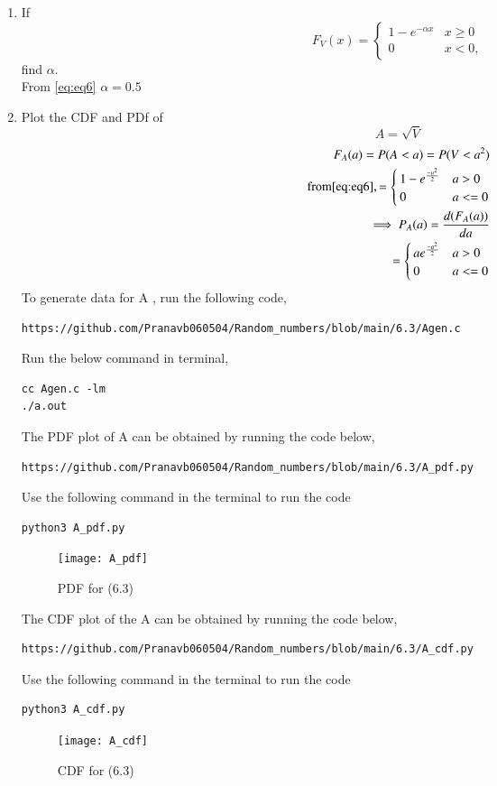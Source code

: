 \documentclass[journal,12pt,twocolumn]{IEEEtran}
\renewcommand\thesection{\arabic{section}}
\begin{document}
\begin{enumerate}[label=\thesection.\arabic*
,ref=\thesection.\theenumi]
%
\item
If
\begin{equation}
F_{V}(x) = 
\begin{cases}
1 - e^{-\alpha x} & x \geq 0 \\
0 & x < 0,
\end{cases}
\end{equation}
find $\alpha$.
\\
\solution 
From \eqref{eq:eq6} $\alpha=0.5$
%
\item
\label{ch3_raleigh_sim}
Plot the CDF and PDf of
%
\begin{equation}
A = \sqrt{V}
\end{equation}
%
\solution
\begin{align}
F_{A}(a)=P(A<a)=P(V<a^{2})\\
\text{from} \eqref{eq:eq6}, 
=\begin{cases}
1-e^{\frac{-a^{2}}{2}} & a>0\\
0 & a<=0
\end{cases}
\\
\implies P_{A}(a)= \frac{d(F_{A}(a))}{da}\\
=\begin{cases}
ae^{\frac{-a^{2}}{2}} & a>0\\
0 & a<=0
\end{cases}
\end{align}
To generate data for A , run the following code,
\begin{lstlisting}
https://github.com/Pranavb060504/Random_numbers/blob/main/6.3/Agen.c
\end{lstlisting}
Run the below command in terminal,
\begin{lstlisting}
cc Agen.c -lm
./a.out
\end{lstlisting}
The PDF plot of A can be obtained by running the code below,
\begin{lstlisting}
https://github.com/Pranavb060504/Random_numbers/blob/main/6.3/A_pdf.py
\end{lstlisting}
Use the following command in the terminal to run the code
\begin{lstlisting}
python3 A_pdf.py
\end{lstlisting}
\begin{figure}[h]
\texttt{[image: A\_pdf]}
\caption{PDF for (6.3)}
\label{fig:A_PDF}
\end{figure}
The CDF plot of the A can be obtained by running the code below,
\begin{lstlisting}
https://github.com/Pranavb060504/Random_numbers/blob/main/6.3/A_cdf.py
\end{lstlisting}
Use the following command in the terminal to run the code
\begin{lstlisting}
python3 A_cdf.py
\end{lstlisting}
\begin{figure}[h]
\texttt{[image: A\_cdf]}
\caption{CDF for (6.3)}
\label{fig:A_PDF}
\end{figure}
\end{enumerate}
\end{document}
